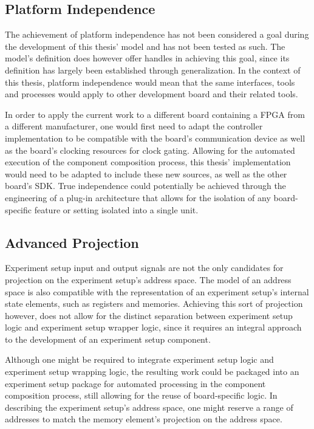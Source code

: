 \documentclass[main.tex]{subfiles}
\begin{document}
\subsection{Platform Independence}
The achievement of platform independence has not been considered a goal during the development of this thesis' model and has not been tested as such. The model's definition does however offer handles in achieving this goal, since its definition has largely been established through generalization. In the context of this thesis, platform independence would mean that the same interfaces, tools and processes would apply to other development board and their related tools.

In order to apply the current work to a different board containing a FPGA from a different manufacturer, one would first need to adapt the controller implementation to be compatible with the board's communication device as well as the board's clocking resources for clock gating. Allowing for the automated execution of the component composition process, this thesis' implementation would need to be adapted to include these new sources, as well as the other board's SDK. True independence could potentially be achieved through the engineering of a plug-in architecture that allows for the isolation of any board-specific feature or setting isolated into a single unit. 

\subsection{Advanced Projection}
Experiment setup input and output signals are not the only candidates for projection on the experiment setup's address space. The model of an address space is also compatible with the representation of an experiment setup's internal state elements, such as registers and memories. Achieving this sort of projection however, does not allow for the distinct separation between experiment setup logic and experiment setup wrapper logic, since it requires an integral approach to the development of an experiment setup component. 

Although one might be required to integrate experiment setup logic and experiment setup wrapping logic, the resulting work could be packaged into an experiment setup package for automated processing in the component composition process, still allowing for the reuse of board-specific logic. In describing the experiment setup's address space, one might reserve a range of addresses to match the memory element's projection on the address space.
\end{document}
